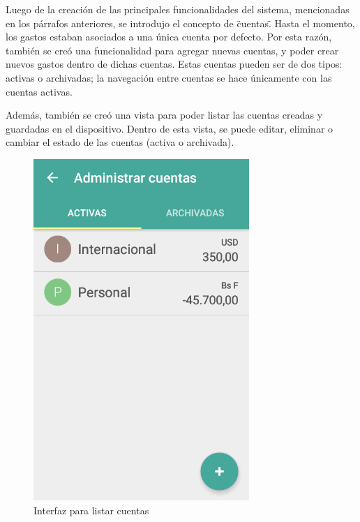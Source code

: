 Luego de la creación de las principales funcionalidades del sistema, mencionadas en los párrafos anteriores, se introdujo el concepto de \"cuentas\". Hasta el momento, los gastos estaban asociados a una única cuenta por defecto. Por esta razón, también se creó una funcionalidad para agregar nuevas cuentas, y poder crear nuevos gastos dentro de dichas cuentas. Estas cuentas pueden ser de dos tipos: activas o archivadas; la navegación entre cuentas se hace únicamente con las cuentas activas. 

Además, también se creó una vista para poder listar las cuentas creadas y guardadas en el dispositivo. Dentro de esta vista, se puede editar, eliminar o cambiar el estado de las cuentas (activa o archivada).


\begin{figure}[ht]
  \centering
  \includegraphics[scale=0.45,type=png,ext=.png,read=.png]{imagenes/active_accounts}
  \caption{Interfaz para listar cuentas}
  \label{fig:interfazListarCuentasActivas}
\end{figure}

